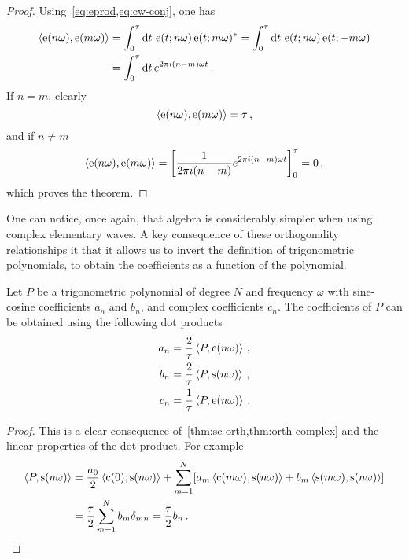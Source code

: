 \begin{proof}
  Using~\cref{eq:eprod,eq:cw-conj}, one has
  \begin{align}
    \braket{\operatorname{e}(n\omega),\operatorname{e}(m\omega)}
    &=\int_{0}^{\tau}\mathrm{d} t\,\operatorname{e}(t;n\omega)\operatorname{e}(t;m\omega)^*
    =\int_{0}^{\tau}\mathrm{d} t\,\operatorname{e}(t;n\omega)\operatorname{e}(t;-m\omega)\\
    &=\int_{0}^{\tau}\mathrm{d} t\,e^{2\pi i (n-m)\omega t}\,.
  \end{align}
  If $n=m$, clearly
  \begin{equation}
    \braket{\operatorname{e}(n\omega),\operatorname{e}(m\omega)}=\tau\,,
  \end{equation}
  and if $n\neq m$
  \begin{equation}
    \braket{\operatorname{e}(n\omega),\operatorname{e}(m\omega)}=
    \left[\frac{1}{2\pi i (n-m)}e^{2\pi i (n-m)\omega t}\right]_0^\tau=0\,,
  \end{equation}
  which proves the theorem.
\end{proof}
One can notice, once again, that algebra is considerably simpler when using complex
elementary waves. A key consequence of these orthogonality relationships it that it allows
us to invert the definition of trigonometric polynomials, \ie to obtain the coefficients
as a function of the polynomial.
\begin{theorem}
  \label{thm:trigp-coeff}
  Let $P$ be a trigonometric polynomial of degree $N$ and frequency $\omega$ with
  sine-cosine coefficients $a_n$ and $b_n$, and complex coefficients $c_n$. The
  coefficients of $P$ can be obtained using the following dot products
  \begin{align}
    a_n&=\frac{2}{\tau}\braket{P,\operatorname{c}(n\omega)}\,,\\
    b_n&=\frac{2}{\tau}\braket{P,\operatorname{s}(n\omega)}\,,\\
    c_n&=\frac{1}{\tau}\braket{P,\operatorname{e}(n\omega)}\,.\label{eq:trigp-cn}
  \end{align}
\end{theorem}
\begin{proof}
  This is a clear consequence of~\cref{thm:sc-orth,thm:orth-complex} and the linear
  properties of the dot product. For example
  \begin{align}
    \braket{P,\operatorname{s}(n\omega)}&=\frac{a_0}{2}\braket{\operatorname{c}(0),\operatorname{s}(n\omega)}+
    \sum_{m=1}^N[a_m\braket{\operatorname{c}(m\omega),\operatorname{s}(n\omega)}
    +b_m\braket{\operatorname{s}(m\omega),\operatorname{s}(n\omega)}]\\
    &=\frac{\tau}{2}\sum_{m=1}^Nb_m\delta_{mn}=\frac{\tau}{2}b_n\,.
  \end{align}
\end{proof}
